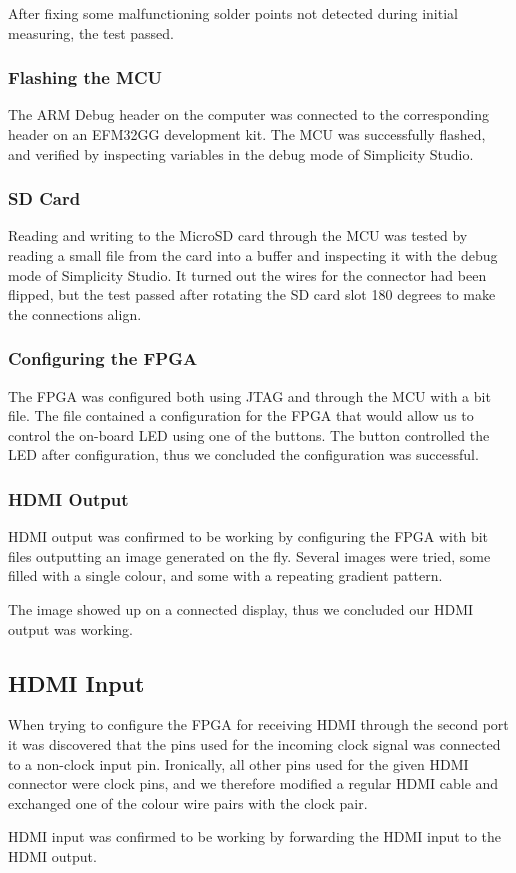 After fixing some malfunctioning solder points not detected during initial measuring, the test passed.

\subsubsection{Flashing the MCU}
The ARM Debug header on the computer was connected to the corresponding header on an EFM32GG development kit. The MCU was successfully flashed, and verified by inspecting variables in the debug mode of Simplicity Studio.

\subsubsection{SD Card}
Reading and writing to the MicroSD card through the MCU was tested by reading a small file from the card into a buffer and inspecting it with the debug mode of Simplicity Studio. It turned out the wires for the connector had been flipped, but the test passed after rotating the SD card slot 180 degrees to make the connections align.

\subsubsection{Configuring the FPGA}
The FPGA was configured both using JTAG and through the MCU with a bit file. The file contained a configuration for the FPGA that would allow us to control the on-board LED using one of the buttons. The button controlled the LED after configuration, thus we concluded the configuration was successful.

\subsubsection{HDMI Output}
HDMI output was confirmed to be working by configuring the FPGA with bit files outputting an image generated on the fly.
Several images were tried, some filled with a single colour, and some with a repeating gradient pattern.

The image showed up on a connected display, thus we concluded our HDMI output was working.

\subsection{HDMI Input}
When trying to configure the FPGA for receiving HDMI through the second port it was discovered that the pins used for the incoming clock signal was connected to a non-clock input pin.
Ironically, all other pins used for the given HDMI connector were clock pins, and we therefore modified a regular HDMI cable and exchanged one of the colour wire pairs with the clock pair.

HDMI input was confirmed to be working by forwarding the HDMI input to the HDMI output.
